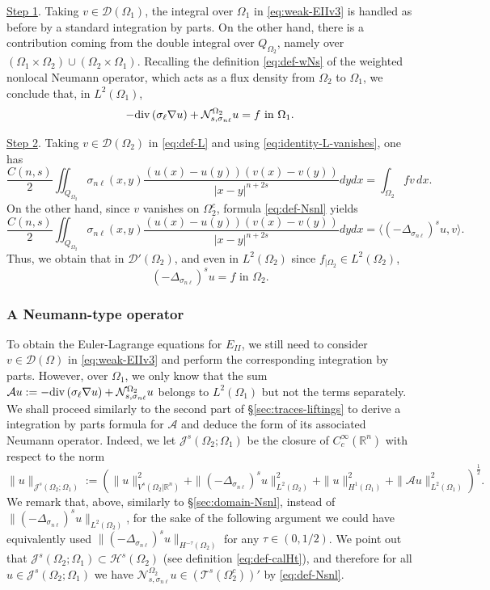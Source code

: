 \documentclass{amsart}
\newcommand{\Ol}{\Omega_{1}}%
\newcommand{\Onl}{\Omega_{2}}%
\renewcommand{\sl}{{\sigma_\ell}}
\newcommand{\snl}{{\sigma_{n\ell}}}
\def\calT{\mathcal{T}}
\def\calA{\mathcal{A}}
\def\R{{\mathbb R}}
\newcommand{\Nsnl}{\mathcal{N}_{s,\snl}}
\renewcommand{\div}{{\rm div}\,}
\theoremstyle{plain}
\numberwithin{equation}{section}
\numberwithin{table}{section}
\numberwithin{figure}{section}
\numberwithin{theorem}{section}
\numberwithin{corollary}{section}
\numberwithin{definition}{section}
\numberwithin{lemma}{section}
\numberwithin{proposition}{section}
\numberwithin{remark}{section}
\begin{document}
\noindent
\underline{Step 1}. Taking $v\in{\mathcal D}(\Ol)$, the integral over $\Ol$ in \eqref{eq:weak-EIIv3} is handled as before by a standard integration by parts. On the other hand, there is a contribution coming from the double integral over $Q_{\Onl}$, namely over $(\Ol\times\Onl)\cup(\Onl\times\Ol)$. Recalling the definition \eqref{eq:def-wNs} of the weighted  nonlocal Neumann operator, which acts as a flux density from $\Onl$ to $\Ol$, we conclude that, in $L^2(\Ol)$,
\[ -\div (\sl \nabla u) + \Nsnl^{\Onl} u = f \mbox{ in }\Ol. \]

\smallskip

\noindent
\underline{Step 2}. Taking $v\in{\mathcal D}(\Onl)$ in \eqref{eq:def-L} and using \eqref{eq:identity-L-vanishes}, one has
\[ \frac{C(n,s)}{2}\iint_{Q_{\Onl}} \snl(x,y)  \frac{(u(x)-u(y))(v(x)-v(y))}{|x-y|^{n+2s}} dy dx  = \int_{\Onl} f v \, dx.
\]
On the other hand, since $v$ vanishes on $\Onl^c$, formula \eqref{eq:def-Nsnl} yields
\[ \frac{C(n,s)}{2} \iint_{Q_{\Onl}} \snl(x,y) \frac{(u(x)-u(y))(v(x)-v(y))}{|x-y|^{n+2s}} dy dx = \langle  (-\Delta_\snl)^s u, v \rangle. \]
Thus, we obtain that in ${\mathcal D}'(\Onl)$, and even in $L^2(\Onl)$ since $f_{|\Onl}\in L^2(\Onl)$,
\[ (-\Delta_\snl)^s u = f \mbox{ in }\Onl. \]


\subsubsection*{A Neumann-type operator} To obtain the Euler-Lagrange equations for $E_{II}$, we still need to consider $v\in{\mathcal D}(\Omega)$ in \eqref{eq:weak-EIIv3} and perform the corresponding integration by parts. However, over $\Ol$, we only know that the sum $\calA u := -\div (\sl \nabla u) + \Nsnl^{\Onl} u$ belongs to $L^2(\Ol)$ but not the terms separately.
We shall proceed similarly to the second part of \S\ref{sec:traces-liftings} to derive a integration by parts formula for $\calA$ and deduce the form of its associated Neumann operator. Indeed, we let $\mathcal{J}^s(\Onl; \Ol)$ be the closure of $C^\infty_c(\R^n)$ with respect to
the norm
\[
\| u \|_{\mathcal{J}^s(\Onl;\Ol)} := \left( \| u \|_{V^s(\Onl | \R^n)}^2 +  \| (-\Delta_\snl)^s u \|_{L^2(\Onl)}^2 + \| u \|_{H^1(\Ol)}^2 +  \| \calA u \|_{L^2(\Ol)}^2 \right)^{\frac12}.
\]
We remark that, above, similarly to \S\ref{sec:domain-Nsnl}, instead of $\| (-\Delta_\snl)^s u \|_{L^2(\Onl)}$, for the sake of the following argument we could have equivalently used $\| (-\Delta_\snl)^s u \|_{H^{-\tau}(\Onl)}$ for any $\tau \in (0,1/2)$. We point out that $\mathcal{J}^s(\Onl;\Ol) \subset \mathcal{H}^s(\Onl)$ (see definition \eqref{eq:def-calHt}), and therefore for all $u \in  \mathcal{J}^s(\Onl;\Ol) $ we have
 $\Nsnl^{\Onl} u \in \left( \calT^{s}(\Onl^c)\right)'$ by \eqref{eq:def-Nsnl}.
\end{document}

